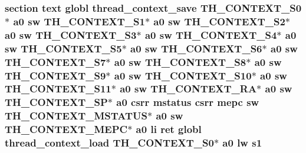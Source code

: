 \hypertarget{riscv_2threada_8S_afb19fa20b2f6715401f73ba9d4f1d177}{
\subsubsection[{s1}]{\setlength{\rightskip}{0pt plus 5cm}section text globl {\bf thread\-\_\-context\-\_\-save} {\bf T\-H\-\_\-\-C\-O\-N\-T\-E\-X\-T\-\_\-\-S0}$\ast$ {\bf a0} {\bf sw} {\bf T\-H\-\_\-\-C\-O\-N\-T\-E\-X\-T\-\_\-\-S1}$\ast$ {\bf a0} {\bf sw} {\bf T\-H\-\_\-\-C\-O\-N\-T\-E\-X\-T\-\_\-\-S2}$\ast$ {\bf a0} {\bf sw} {\bf T\-H\-\_\-\-C\-O\-N\-T\-E\-X\-T\-\_\-\-S3}$\ast$ {\bf a0} {\bf sw} {\bf T\-H\-\_\-\-C\-O\-N\-T\-E\-X\-T\-\_\-\-S4}$\ast$ {\bf a0} {\bf sw} {\bf T\-H\-\_\-\-C\-O\-N\-T\-E\-X\-T\-\_\-\-S5}$\ast$ {\bf a0} {\bf sw} {\bf T\-H\-\_\-\-C\-O\-N\-T\-E\-X\-T\-\_\-\-S6}$\ast$ {\bf a0} {\bf sw} {\bf T\-H\-\_\-\-C\-O\-N\-T\-E\-X\-T\-\_\-\-S7}$\ast$ {\bf a0} {\bf sw} {\bf T\-H\-\_\-\-C\-O\-N\-T\-E\-X\-T\-\_\-\-S8}$\ast$ {\bf a0} {\bf sw} {\bf T\-H\-\_\-\-C\-O\-N\-T\-E\-X\-T\-\_\-\-S9}$\ast$ {\bf a0} {\bf sw} {\bf T\-H\-\_\-\-C\-O\-N\-T\-E\-X\-T\-\_\-\-S10}$\ast$ {\bf a0} {\bf sw} {\bf T\-H\-\_\-\-C\-O\-N\-T\-E\-X\-T\-\_\-\-S11}$\ast$ {\bf a0} {\bf sw} {\bf T\-H\-\_\-\-C\-O\-N\-T\-E\-X\-T\-\_\-\-R\-A}$\ast$ {\bf a0} {\bf sw} {\bf T\-H\-\_\-\-C\-O\-N\-T\-E\-X\-T\-\_\-\-S\-P}$\ast$ {\bf a0} csrr {\bf mstatus} csrr {\bf mepc} {\bf sw} {\bf T\-H\-\_\-\-C\-O\-N\-T\-E\-X\-T\-\_\-\-M\-S\-T\-A\-T\-U\-S}$\ast$ {\bf a0} {\bf sw} {\bf T\-H\-\_\-\-C\-O\-N\-T\-E\-X\-T\-\_\-\-M\-E\-P\-C}$\ast$ {\bf a0} {\bf li} ret globl {\bf thread\-\_\-context\-\_\-load} {\bf T\-H\-\_\-\-C\-O\-N\-T\-E\-X\-T\-\_\-\-S0}$\ast$ {\bf a0} {\bf lw} s1}}\label{riscv_2threada_8S_afb19fa20b2f6715401f73ba9d4f1d177}
